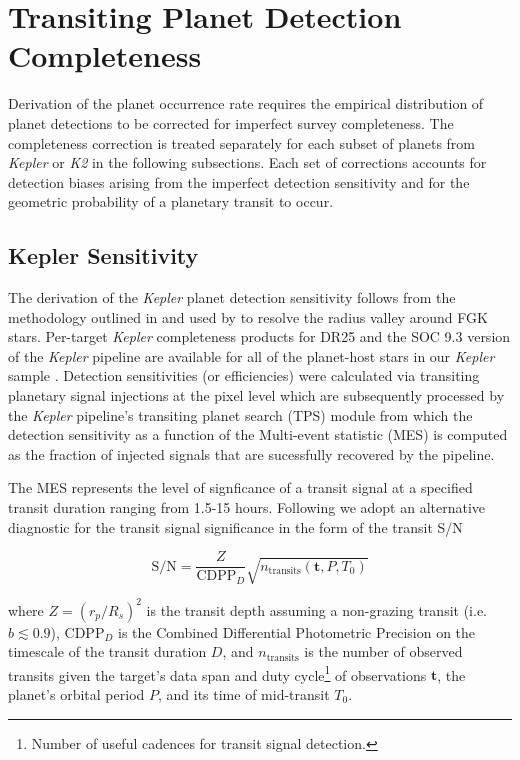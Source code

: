 \documentclass[twocolumn]{emulateapj}
\newcommand{\kepler}[1]{\emph{Kepler}#1}
\newcommand{\ktwo}[1]{\emph{K2}#1}
\begin{document}




\section{Transiting Planet Detection Completeness}  \label{sect:completeness}
Derivation of the planet occurrence rate requires the empirical distribution of planet detections to be corrected
for imperfect survey completeness. The completeness correction is treated separately for each subset
of planets from \kepler{} or \ktwo{} in the following subsections. Each set of corrections accounts for detection
biases arising from the imperfect detection sensitivity and for the 
geometric probability of a planetary transit to occur.

\subsection{Kepler Sensitivity}
The derivation of the \kepler{} planet detection sensitivity follows from the methodology outlined in
\cite{christiansen16} and used by \cite{fulton17} to resolve the radius valley around FGK stars. Per-target
\kepler{} completeness products for DR25 and the SOC 9.3 version of the \kepler{} pipeline
\citep{jenkins10} are available
for all of the planet-host stars in our \kepler{} sample \citep{burke15,burke17}. Detection sensitivities
(or efficiencies) were calculated via transiting planetary signal injections at the pixel level
\citep{christiansen15,christiansen17} which are subsequently processed by the \kepler{} pipeline's
transiting planet search (TPS) module from
which the detection sensitivity as a function of the Multi-event statistic (MES) is computed as the fraction of
injected signals that are sucessfully recovered by the pipeline.

The MES represents the level of signficance of a transit signal at a specified transit duration ranging from
1.5-15 hours. Following \cite{petigura18} we adopt an alternative diagnostic for the transit signal significance
in the form of the transit S/N 

\begin{equation}
  \text{S/N} = \frac{Z}{\text{CDPP}_{D}} \sqrt{n_{\text{transits}}(\mathbf{t},P,T_0)}  \label{eq:snr}
\end{equation}

\noindent where $Z=(r_p/R_s)^2$ is the transit depth assuming a non-grazing transit (i.e. $b\lesssim 0.9$),
CDPP$_D$ is the Combined Differential Photometric
Precision on the timescale of the transit duration $D$, and $n_{\text{transits}}$ is the number of
observed transits given the target's data span and duty cycle\footnote{Number of useful cadences for transit signal
detection.} of observations $\textbf{t}$, the planet's orbital period $P$, and its time of mid-transit $T_0$.
\end{document}
